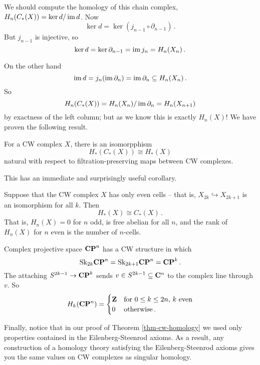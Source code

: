 We should compute the homology of this chain complex, $ H_n(C_\ast(X))=\ker d/\operatorname{im} d$. Now
\[
\ker d=\ker (j_{n-1}\circ\partial_{n-1})\,.
\]
But $j_{n-1}$ is injective, so 
\[
\ker d=\ker\partial_{n-1}=\operatorname{im} j_n=H_n(X_n)\,.
\]

On the other hand 
\[
\operatorname{im} d=j_n(\operatorname{im}\partial_n)=\operatorname{im}\partial_n\subseteq H_n(X_n)\,.
\]
So 
\[
H_n(C_*(X))=H_n(X_n)/\operatorname{im}\partial_n=H_n(X_{n+1})
\]
by exactness of the left column; but as we know this is exactly $H_n(X)$!
We have proven the following result.
\begin{theorem} \label{thm-cw-homology}
For a CW complex $X$, there is an isomorpphism
\[
H_\ast(C_\ast(X))\cong H_\ast(X)
\]
natural with respect to filtration-preserving maps between CW complexes.
\end{theorem}
This has an immediate and surprisingly useful corollary.
\begin{corollary}
Suppose that the CW complex $X$ has only even cells -- that is, 
$X_{2k}\hookrightarrow X_{2k+1}$ is an isomorphism for all $k$.
Then 
\[
H_*(X)\cong C_*(X)\,.
\]
That is, $H_n(X)=0$ for $n$ odd, is free abelian for all $n$, 
and the rank of $H_n(X)$ for $n$ even is the number of $n$-cells. 
\end{corollary}
\begin{example}
Complex projective space $\mathbf{CP}^n$ has a CW structure in which 
\[
\mathrm{Sk}_{2k}\mathbf{CP}^n=\mathrm{Sk}_{2k+1}\mathbf{CP}^n=\mathbf{CP}^k\,.
\] 
The attaching $S^{2k-1}\to\mathbf{CP}^k$
sends $v\in S^{2k-1}\subseteq\mathbf C^n$ to the complex line through $v$. So 
\[
H_k(\mathbf{CP}^n)=\begin{cases}\mathbf Z & \hbox{for}\,\,0\leq k\leq 2n,\, k\,\,\hbox{even}\\
0 & \hbox{otherwise}
\,.\end{cases}
\]
\end{example}

Finally, notice that in our proof of Theorem \ref{thm-cw-homology} we used only properties contained in the Eilenberg-Steenrod axioms. As a result,
any construction of a homology theory satisfying the Eilenberg-Steenrod axioms gives you the same values on CW complexes as singular homology. 
